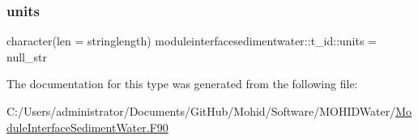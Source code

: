 \mbox{\label{structmoduleinterfacesedimentwater_1_1t__id_a2a3204affa0f89c8787d9a6c7e8b7256}} 
\subsubsection{\texorpdfstring{units}{units}}
{\footnotesize\ttfamily character(len = stringlength) moduleinterfacesedimentwater\+::t\+\_\+id\+::units = null\+\_\+str\hspace{0.3cm}{\ttfamily [private]}}



The documentation for this type was generated from the following file\+:\begin{DoxyCompactItemize}
\item 
C\+:/\+Users/administrator/\+Documents/\+Git\+Hub/\+Mohid/\+Software/\+M\+O\+H\+I\+D\+Water/\mbox{\hyperlink{_module_interface_sediment_water_8_f90}{Module\+Interface\+Sediment\+Water.\+F90}}\end{DoxyCompactItemize}
